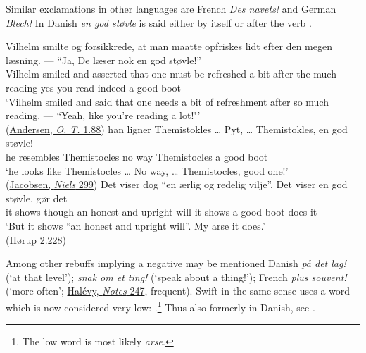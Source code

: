 Similar exclamations in other languages are French \textit{Des navets!} and German \textit{Blech!} In Danish \textit{en god støvle} is said either by itself or after the verb .

\ea \label{ex:04-140}
\ea
\gll Vilhelm smilte og forsikkrede, at man maatte opfriskes lidt efter den megen læsning. --- ``Ja, De læser nok en god støvle!''\\
 Vilhelm smiled and asserted that one must {be refreshed} {a bit} after the much reading {} yes you read indeed a good boot\\
\glt `Vilhelm smiled and said that one needs a bit of refreshment after so much reading. --- ``Yeah, like you're reading a lot!"'
\\\hfill(\href{https://tekster.kb.dk/text/adl-texts-andersen04val-root}{Andersen, \textit{O. T.} 1.88}) %
\ex
\gll han ligner Themistokles {\dots} Pyt, {\dots} Themistokles, en god støvle!\\
 he resembles Themistocles {} {no way} {} Themistocles a good boot\\
\glt `he looks like Themistocles {\dots} No way, {\dots} Themistocles, good one!'\\ %
\hfill(\href{https://tekster.kb.dk/text/adl-texts-jacobjp06val-root}{Jacobsen, \textit{Niels} 299})
\ex
\gll Det viser dog ``en ærlig og redelig vilje''. Det viser en god støvle, gør det\\
 it shows though an honest and upright will it shows a good boot does it\\
\glt `But it shows ``an honest and upright will''. My arse it does.'\\
\hfill(Hørup 2.228) %

\z
\z

Among other rebuffs implying a negative may be mentioned Danish \textit{på det lag!} (`at that level'); \textit{snak om et ting!} (`speak about a thing!'); French \textit{plus souvent!} %
(`more often'; \href{https://archive.org/details/notesetsouvenir00halgoog/page/n261/mode/2up}{Halévy, \textit{Notes} 247}, frequent). Swift in the same sense uses a word which is now considered very low: .\footnote{The low word is most likely \textit{arse}. \eds} Thus also formerly in Danish, see .

